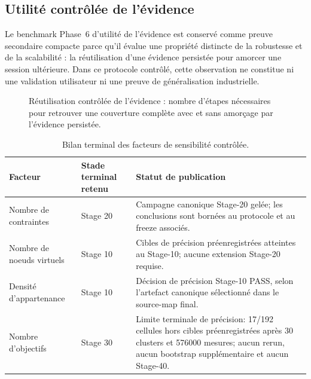 \subsection{Utilité contrôlée de l'évidence}

Le benchmark Phase~6 d'utilité de l'évidence est conservé comme preuve secondaire compacte parce qu'il évalue une propriété distincte de la robustesse et de la scalabilité : la réutilisation d'une évidence persistée pour amorcer une session ultérieure. Dans ce protocole contrôlé, cette observation ne constitue ni une validation utilisateur ni une preuve de généralisation industrielle.



\begin{figure}[!t]
\centering

\caption{Réutilisation contrôlée de l'évidence : nombre d'étapes nécessaires pour retrouver une couverture complète avec et sans amorçage par l'évidence persistée.}
\label{fig:v4-evidence-steps}
\end{figure}


\begin{table}[t]
\centering
\caption{Bilan terminal des facteurs de sensibilité contrôlée.}
\label{tab:sensitivity-final}
\small
\begin{tabular}{p{}p{}p{}}
\hline
Facteur & Stade terminal retenu & Statut de publication \\
\hline
Nombre de contraintes
& Stage 20
& Campagne canonique Stage-20 gelée; les conclusions sont bornées au protocole et au freeze associés. \\

Nombre de noeuds virtuels
& Stage 10
& Cibles de précision préenregistrées atteintes au Stage-10; aucune extension Stage-20 requise. \\

Densité d'appartenance
& Stage 10
& Décision de précision Stage-10 PASS, selon l'artefact canonique sélectionné dans le source-map final. \\

Nombre d'objectifs
& Stage 30
& Limite terminale de précision: 17/192 cellules hors cibles préenregistrées après 30 clusters et 576000 mesures; aucun rerun, aucun bootstrap supplémentaire et aucun Stage-40. \\
\hline
\end{tabular}
\end{table}


